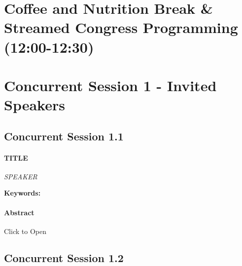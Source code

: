 \documentclass[
]{book}
\begin{document}
\hypertarget{coffee-and-nutrition-break-streamed-congress-programming-1200-1230}{%
\section*{Coffee and Nutrition Break \& Streamed Congress Programming (12:00-12:30)}\label{coffee-and-nutrition-break-streamed-congress-programming-1200-1230}}

\hypertarget{concurrent-session-1---invited-speakers}{%
\section*{Concurrent Session 1 - Invited Speakers}\label{concurrent-session-1---invited-speakers}}

\hypertarget{concurrent-session-1.1}{%
\subsection*{Concurrent Session 1.1}\label{concurrent-session-1.1}}

\begin{speaker}
\hypertarget{title}{%
\paragraph{\texorpdfstring{\textbf{TITLE}}{TITLE}}\label{title}}

\emph{SPEAKER}

\textbf{Keywords:}

\hypertarget{abstract}{%
\paragraph{Abstract}\label{abstract}}

Click to Open
\end{speaker}

\hypertarget{concurrent-session-1.2}{%
\subsection*{Concurrent Session 1.2}\label{concurrent-session-1.2}}
\end{document}
